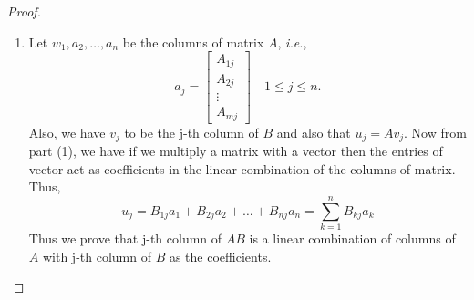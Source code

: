 \documentclass[12pt, a4paper]{article}
\theoremstyle{definition}
\theoremstyle{remark}
\begin{document}
\begin{proof}
\begin{enumerate}
\begin{align*}
\begin{bmatrix}
                B_{11} \\ B_{21} \\ \vdots \\ B_{n1}
            \end{bmatrix} + a_2\begin{bmatrix}
                B_{12} \\ B_{22} \\ \vdots \\ B_{n2}
            \end{bmatrix} + \ldots + a_p\begin{bmatrix}
                B_{1p} \\ B_{2p} \\ \vdots \\ B_{np}
            \end{bmatrix} \\
            &= a_1v_1+a_2v_2+\ldots+a_pv_p \\
            &= \sum_{j=1}^pa_jv_j
        \end{align*}
        Thus we prove that if we multiply a vector to a matrix then the entries of the vector acts as coefficients to the linear combination of the columns of the matrix.

        \item Let $w_1,a_2,\ldots,a_n$ be the columns of matrix $A$, \textit{i.e.},
        \[
        a_j = \begin{bmatrix}
            A_{1j} \\ A_{2j} \\ \vdots \\ A_{mj}
        \end{bmatrix} \quad 1 \le j \le n.
        \]
        Also, we have $v_j$ to be the j-th column of $B$ and also that $u_j = Av_j$. Now from part (1), we have if we multiply a matrix with a vector then the entries of vector act as coefficients in the linear combination of the columns of matrix. Thus,
        \[
        u_j = B_{1j}a_1 + B_{2j}a_2+ \ldots + B_{nj}a_n = \sum_{k=1}^nB_{kj}a_k
        \]
        Thus we prove that j-th column of $AB$ is a linear combination of columns of $A$ with j-th column of $B$ as the coefficients.


\end{enumerate}
\end{proof}
\end{document}
